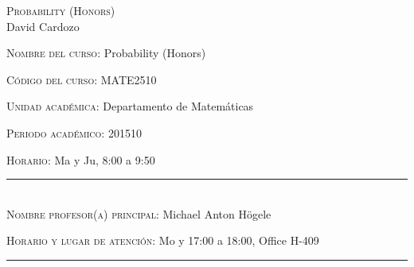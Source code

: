 \begin{center}
\textsc{\large Probability (Honors) }\\[0.1cm]
\large David Cardozo\\[0.5cm]
\end{center}	

\large \noindent\textsc{Nombre del curso:}  Probability (Honors)%

\noindent\textsc{Código del curso:} MATE2510 %

\noindent\textsc{Unidad académica:} Departamento de Matemáticas

\noindent\textsc{Periodo acad\'emico:} 201510 %

\noindent\textsc{Horario:} Ma y Ju, 8:00 a 9:50%

\noindent\rule{\textwidth}{1pt}\\[-0.3cm]

\normalsize \noindent\textsc{Nombre profesor(a) principal:}  Michael Anton Högele%


\noindent\textsc{Horario y lugar de atenci\'on:} Mo y  17:00 a
18:00, Office H-409

\noindent\rule{\textwidth}{1pt}\\[-0.1cm]